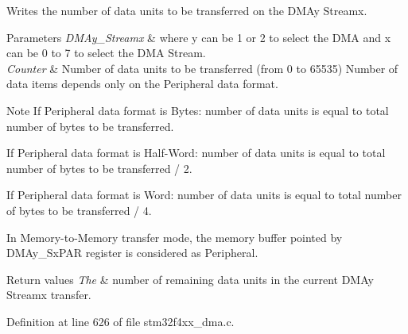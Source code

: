Writes the number of data units to be transferred on the D\+M\+Ay Streamx. 


\begin{DoxyParams}{Parameters}
{\em D\+M\+Ay\+\_\+\+Streamx} & where y can be 1 or 2 to select the D\+MA and x can be 0 to 7 to select the D\+MA Stream. \\
\hline
{\em Counter} & Number of data units to be transferred (from 0 to 65535) Number of data items depends only on the Peripheral data format.\\
\hline
\end{DoxyParams}
\begin{DoxyNote}{Note}
If Peripheral data format is Bytes\+: number of data units is equal to total number of bytes to be transferred.

If Peripheral data format is Half-\/\+Word\+: number of data units is equal to total number of bytes to be transferred / 2.

If Peripheral data format is Word\+: number of data units is equal to total number of bytes to be transferred / 4.

In Memory-\/to-\/\+Memory transfer mode, the memory buffer pointed by D\+M\+Ay\+\_\+\+Sx\+P\+AR register is considered as Peripheral.
\end{DoxyNote}

\begin{DoxyRetVals}{Return values}
{\em The} & number of remaining data units in the current D\+M\+Ay Streamx transfer. \\
\hline
\end{DoxyRetVals}


Definition at line 626 of file stm32f4xx\+\_\+dma.\+c.


